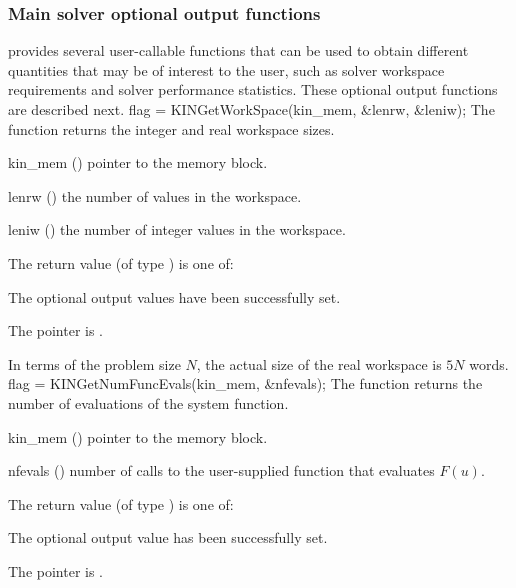 \subsubsection{Main solver optional output functions}
{\kinsol} provides several user-callable functions that can be used to obtain
different quantities that may be of interest to the user, such as solver workspace
requirements and solver performance statistics.
These optional output functions are described next.
{
  flag = KINGetWorkSpace(kin\_mem, \&lenrw, \&leniw);
}
{
  The function  returns the
  {\kinsol} integer and real workspace sizes.
}
{
  \begin{args}
  \item[kin\_mem] ()
    pointer to the {\kinsol} memory block.
  \item[lenrw] ()
    the number of  values in the {\kinsol} workspace.
  \item[leniw] ()
    the number of integer values in the {\kinsol} workspace.
  \end{args}
}
{
  The return value  (of type ) is one of:
  \begin{args}
  \item[\Id{KIN\_SUCCESS}] 
    The optional output values have been successfully set.
  \item[\Id{KIN\_MEM\_NULL}]
    The  pointer is .
  \end{args}
}
{
  In terms of the problem size $N$, the actual size of the real workspace 
  is $5 N$  words.
}
{
  flag = KINGetNumFuncEvals(kin\_mem, \&nfevals);
}
{
  The function  returns the number of evaluations
  of the system function.
}
{
  \begin{args}
  \item[kin\_mem] ()
    pointer to the {\kinsol} memory block.
  \item[nfevals] ()
    number of calls to the user-supplied function that evaluates $F(u)$.
  \end{args}
}
{
  The return value  (of type ) is one of:
  \begin{args}
  \item[\Id{KIN\_SUCCESS}] 
    The optional output value has been successfully set.
  \item[\Id{KIN\_MEM\_NULL}]
    The  pointer is .
  \end{args}
}
